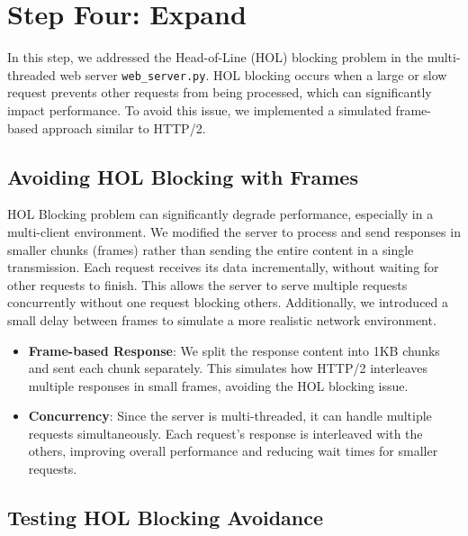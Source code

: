 \documentclass{article}
\begin{document}
\section*{Step Four: Expand}

In this step, we addressed the Head-of-Line (HOL) blocking problem in the multi-threaded web server \texttt{web\_server.py}. HOL blocking occurs when a large or slow request prevents other requests from being processed, which can significantly impact performance. To avoid this issue, we implemented a simulated frame-based approach similar to HTTP/2.

\subsection*{Avoiding HOL Blocking with Frames}

HOL Blocking problem can significantly degrade performance, especially in a multi-client environment. We modified the server to process and send responses in smaller chunks (frames) rather than sending the entire content in a single transmission. Each request receives its data incrementally, without waiting for other requests to finish. This allows the server to serve multiple requests concurrently without one request blocking others. Additionally, we introduced a small delay between frames to simulate a more realistic network environment.

\begin{itemize}
    \item \textbf{Frame-based Response}: We split the response content into 1KB chunks and sent each chunk separately. This simulates how HTTP/2 interleaves multiple responses in small frames, avoiding the HOL blocking issue.
    \item \textbf{Concurrency}: Since the server is multi-threaded, it can handle multiple requests simultaneously. Each request's response is interleaved with the others, improving overall performance and reducing wait times for smaller requests.
\end{itemize}

\subsection*{Testing HOL Blocking Avoidance}
\end{document}
